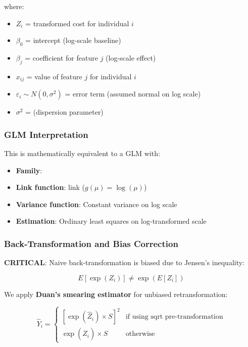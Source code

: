 where:
\begin{itemize}
    \item $Z_i$ = transformed cost for individual $i$
    \item $\beta_0$ = intercept (log-scale baseline)
    \item $\beta_j$ = coefficient for feature $j$ (log-scale effect)
    \item $x_{ij}$ = value of feature $j$ for individual $i$
    \item $\varepsilon_i \sim N(0, \sigma^2)$ = error term (assumed normal on log scale)
    \item $\sigma^2$ = \ModelSixDispersion{} (dispersion parameter)
\end{itemize}

\subsubsection{GLM Interpretation}

This is mathematically equivalent to a GLM with:
\begin{itemize}
    \item \textbf{Family}: \ModelSixDistribution{}
    \item \textbf{Link function}: \ModelSixLinkFunction{} link ($g(\mu) = \log(\mu)$)
    \item \textbf{Variance function}: Constant variance on log scale
    \item \textbf{Estimation}: Ordinary least squares on log-transformed scale
\end{itemize}

\subsubsection{Back-Transformation and Bias Correction}

\textbf{CRITICAL}: Naive back-transformation is biased due to Jensen's inequality:

\begin{equation}
E[\exp(Z_i)] \neq \exp(E[Z_i])
\end{equation}

We apply \textbf{Duan's smearing estimator} for unbiased retransformation:

\begin{equation}
\hat{Y}_i = 
\begin{cases}
\left[\exp(\hat{Z}_i) \times S\right]^2 & \text{if using sqrt pre-transformation} \\
\exp(\hat{Z}_i) \times S & \text{otherwise}
\end{cases}
\end{equation}

